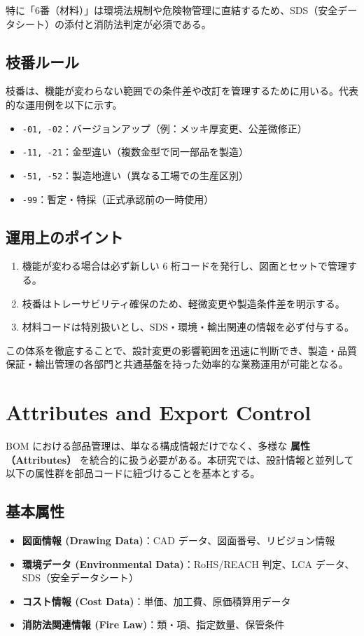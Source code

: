 \documentclass[10pt,conference]{IEEEtran}
\begin{document}
特に「6番（材料）」は環境法規制や危険物管理に直結するため、SDS（安全データシート）の添付と消防法判定が必須である。

\subsection{枝番ルール}
枝番は、機能が変わらない範囲での条件差や改訂を管理するために用いる。代表的な運用例を以下に示す。

\begin{itemize}
  \item \texttt{-01, -02}：バージョンアップ（例：メッキ厚変更、公差微修正）
  \item \texttt{-11, -21}：金型違い（複数金型で同一部品を製造）
  \item \texttt{-51, -52}：製造地違い（異なる工場での生産区別）
  \item \texttt{-99}：暫定・特採（正式承認前の一時使用）
\end{itemize}

\subsection{運用上のポイント}
\begin{enumerate}
  \item 機能が変わる場合は必ず新しい 6 桁コードを発行し、図面とセットで管理する。  
  \item 枝番はトレーサビリティ確保のため、軽微変更や製造条件差を明示する。  
  \item 材料コードは特別扱いとし、SDS・環境・輸出関連の情報を必ず付与する。  
\end{enumerate}

この体系を徹底することで、設計変更の影響範囲を迅速に判断でき、製造・品質保証・輸出管理の各部門と共通基盤を持った効率的な業務運用が可能となる。

\section{Attributes and Export Control}
BOM における部品管理は、単なる構成情報だけでなく、多様な \textbf{属性（Attributes）} を統合的に扱う必要がある。本研究では、設計情報と並列して以下の属性群を部品コードに紐づけることを基本とする。

\subsection{基本属性}
\begin{itemize}
  \item \textbf{図面情報 (Drawing Data)}：CAD データ、図面番号、リビジョン情報
  \item \textbf{環境データ (Environmental Data)}：RoHS/REACH 判定、LCA データ、SDS（安全データシート）
  \item \textbf{コスト情報 (Cost Data)}：単価、加工費、原価積算用データ
  \item \textbf{消防法関連情報 (Fire Law)}：類・項、指定数量、保管条件
\end{itemize}
\end{document}
